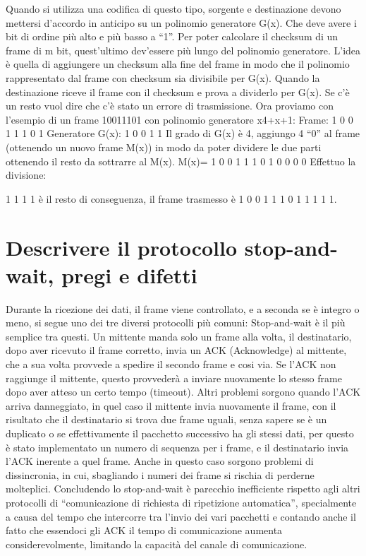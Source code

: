 Quando si utilizza una codifica di questo tipo, sorgente e destinazione devono mettersi d’accordo in anticipo su un polinomio generatore G(x). Che deve avere i bit di ordine più alto e più basso a “1”.
Per poter calcolare il checksum di un frame di m bit, quest’ultimo dev’essere più lungo del polinomio generatore. L’idea è quella di aggiungere un checksum alla fine del frame in modo che il polinomio rappresentato dal frame con checksum sia divisibile per G(x). Quando la destinazione riceve il frame con il checksum e prova a dividerlo per G(x). Se c’è un resto vuol dire che c’è stato un errore di trasmissione.
Ora proviamo con l’esempio di un frame 10011101 con polinomio generatore x4+x+1:
Frame: 1 0 0 1 1 1 0 1 
Generatore G(x): 1 0 0 1 1
Il grado di G(x) è 4, aggiungo 4 “0” al frame (ottenendo un nuovo frame M(x)) in modo da poter dividere le due parti ottenendo il resto da sottrarre al M(x).
M(x)= 1 0 0 1 1 1 0 1 0 0 0 0
Effettuo la divisione: 
             
1 1 1 1 è il resto di conseguenza, il frame trasmesso è 1 0 0 1  1 1 0 1  1 1 1 1.

\section{Descrivere il protocollo stop-and-wait, pregi e difetti}

Durante la ricezione dei dati, il frame viene controllato, e a seconda se è integro o meno, si segue uno dei tre diversi protocolli più comuni: 
Stop-and-wait è il più semplice tra questi.
Un mittente manda solo un frame alla volta, il destinatario, dopo aver ricevuto il frame corretto, invia un ACK (Acknowledge) al mittente, che a sua volta provvede a spedire il secondo frame e cosi via. 
Se l’ACK non raggiunge il mittente, questo provvederà a inviare nuovamente lo stesso frame dopo aver atteso un certo tempo (timeout).
Altri problemi sorgono quando l’ACK arriva danneggiato, in quel caso il mittente invia nuovamente il frame, con il risultato che il destinatario si trova due frame uguali, senza sapere se è un duplicato o se effettivamente il pacchetto successivo ha gli stessi dati, per questo è stato implementato un numero di sequenza per i frame, e il destinatario invia l’ACK inerente a quel frame.
Anche in questo caso sorgono problemi di dissincronia, in cui, sbagliando i numeri dei frame si rischia di perderne molteplici.
Concludendo lo stop-and-wait è parecchio inefficiente rispetto agli altri protocolli di “comunicazione di richiesta di ripetizione automatica”, specialmente a causa del tempo che intercorre tra l’invio dei vari pacchetti e contando anche il fatto che essendoci gli ACK il tempo di comunicazione aumenta considerevolmente, limitando la capacità del canale di comunicazione.
 

